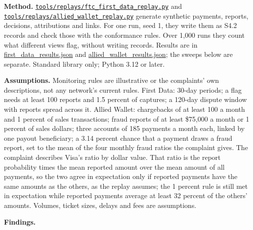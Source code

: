 \documentclass[
  11pt,
]{article}
\begin{document}
\textbf{Method.}
\href{tools/replays/ftc_first_data_replay.py}{\texttt{tools/\allowbreak replays/\allowbreak ftc\_first\_data\_replay.py}}
and
\href{tools/replays/allied_wallet_replay.py}{\texttt{tools/\allowbreak replays/\allowbreak allied\_wallet\_replay.py}}
generate synthetic payments, reports, decisions, attributions and links.
For one run, seed 1, they write them as S4.2 records and check those
with the conformance rules. Over 1,000 runs they count what different
views flag, without writing records. Results are in
\href{SUPPLEMENT/S10_REPLAYS/first_data_results.json}{first\_data\_results.json}
and
\href{SUPPLEMENT/S10_REPLAYS/allied_wallet_results.json}{allied\_wallet\_results.json};
the sweeps below are separate. Standard library only; Python 3.12 or
later.

\textbf{Assumptions.} Monitoring rules are illustrative or the
complaints' own descriptions, not any network's current rules. First
Data: 30-day periods; a flag needs at least 100 reports and 1.5 percent
of captures; a 120-day dispute window with reports spread across it.
Allied Wallet: chargebacks of at least 100 a month and 1 percent of
sales transactions; fraud reports of at least \$75,000 a month or 1
percent of sales dollars; three accounts of 185 payments a month each,
linked by one payout beneficiary; a 3.14 percent chance that a payment
draws a fraud report, set to the mean of the four monthly fraud ratios
the complaint gives. The complaint describes Visa's ratio by dollar
value. That ratio is the report probability times the mean reported
amount over the mean amount of all payments, so the two agree in
expectation only if reported payments have the same amounts as the
others, as the replay assumes; the 1 percent rule is still met in
expectation while reported payments average at least 32 percent of the
others' amounts. Volumes, ticket sizes, delays and fees are assumptions.

\textbf{Findings.}

\begingroup\small
\end{document}
